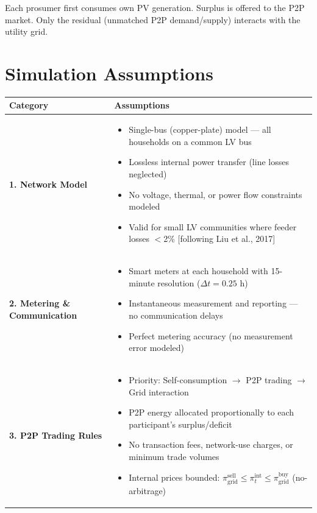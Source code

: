 \documentclass[11pt]{article}
\begin{document}
{\small Each prosumer first consumes own PV generation. Surplus is offered to the P2P market. Only the residual (unmatched P2P demand/supply) interacts with the utility grid.}

\vspace{0.8cm}

\section*{Simulation Assumptions}

\renewcommand{\arraystretch}{1.4}
\begin{table}[h!]
\centering
\small
\begin{tabular}{L{3.5cm} L{12cm}}
\toprule
\textbf{Category} & \textbf{Assumptions} \\
\midrule

\textbf{1. Network Model} &
\begin{itemize} \setlength\itemsep{0pt}
  \item Single-bus (copper-plate) model --- all households on a common LV bus
  \item Lossless internal power transfer (line losses neglected)
  \item No voltage, thermal, or power flow constraints modeled
  \item Valid for small LV communities where feeder losses $<$2\% [following Liu et al., 2017]
\end{itemize} \\

\textbf{2. Metering \& Communication} &
\begin{itemize} \setlength\itemsep{0pt}
  \item Smart meters at each household with 15-minute resolution ($\Delta t = 0.25$ h)
  \item Instantaneous measurement and reporting --- no communication delays
  \item Perfect metering accuracy (no measurement error modeled)
\end{itemize} \\

\textbf{3. P2P Trading Rules} &
\begin{itemize} \setlength\itemsep{0pt}
  \item Priority: Self-consumption $\rightarrow$ P2P trading $\rightarrow$ Grid interaction
  \item P2P energy allocated proportionally to each participant's surplus/deficit
  \item No transaction fees, network-use charges, or minimum trade volumes
  \item Internal prices bounded: $\pi_{\text{grid}}^{\text{sell}} \leq \pi_t^{\text{int}} \leq \pi_{\text{grid}}^{\text{buy}}$ (no-arbitrage)
\end{itemize} \\


\end{tabular}
\end{table}
\end{document}
